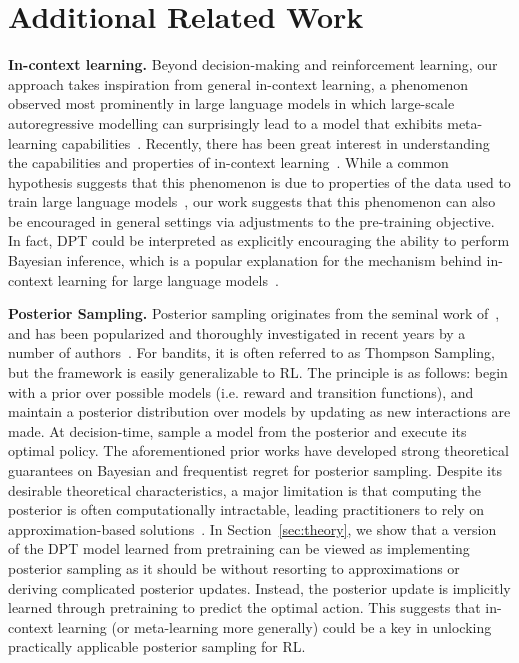 \newpage
\appendix


\section*{Additional Related Work}

\textbf{In-context learning.} Beyond decision-making and reinforcement learning, our approach takes inspiration from general in-context learning, a phenomenon observed most prominently in large language models in which large-scale autoregressive modelling can surprisingly lead to a model that exhibits meta-learning capabilities~\citep{brown2020language}. Recently, there has been great interest in understanding the capabilities and properties of in-context learning~\citep{garg2022can,von2022transformers,razeghi2022impact,olsson2022context,kirsch2022general,shin2022effect,li2023transformers,wies2023learnability,akyurek2022learning,abernethy2023mechanism}. While a common hypothesis suggests that this phenomenon is due to properties of the data used to train large language models~\citep{chan2022data}, our work suggests that this phenomenon can also be encouraged in general settings via adjustments to the pre-training objective. In fact, DPT could be interpreted as explicitly encouraging the ability to perform Bayesian inference, which is a popular explanation for the mechanism behind in-context learning for large language models~\citep{xie2021explanation}. 

\textbf{Posterior Sampling.}  Posterior sampling originates from the seminal work of~\cite{thompson1933likelihood}, and has been popularized and thoroughly investigated in recent years by a number of authors~\cite{russo2018tutorial,agrawal2017near,strens2000bayesian,osband2013more,agrawal2017optimistic,russo2014learning}. For bandits, it is often referred to as Thompson Sampling, but the framework is easily generalizable to RL. The principle is as follows: begin with a prior over possible models (i.e. reward and transition functions), and maintain a posterior distribution over models by updating as new interactions are made. At decision-time, sample a model from the posterior and execute its optimal policy. The aforementioned prior works have developed strong theoretical guarantees on Bayesian and frequentist regret for posterior sampling. Despite its desirable theoretical characteristics, a major limitation is that computing the posterior is often computationally intractable, leading practitioners to rely on approximation-based solutions~\citep{lu2017ensemble,osband2016deep,osband2018randomized}. 
In Section~\ref{sec:theory}, we show that a version of the DPT model learned from pretraining can be viewed as implementing posterior sampling as it should be without resorting to approximations or deriving complicated posterior updates. Instead, the posterior update is implicitly learned through pretraining to predict the optimal action. This suggests that in-context learning (or meta-learning more generally) could be a key in unlocking practically applicable posterior sampling for RL.

